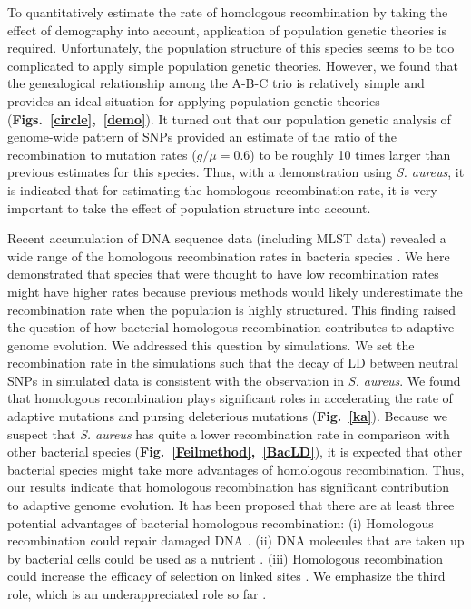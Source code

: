 \documentclass[twoside,twocolumn, letterpaper]{article}
\begin{document}
To quantitatively estimate the rate of homologous recombination by taking the effect of demography into account, application of population genetic theories is required. Unfortunately, the population structure of this species seems to be too complicated to apply simple population genetic theories.  However, we found that the genealogical relationship among the A-B-C trio is relatively simple and provides an ideal situation for applying population genetic theories ({\bf Figs.~\ref{circle},~\ref{demo}}). It turned out that our population genetic analysis of genome-wide pattern of SNPs provided an estimate of the ratio of the recombination to mutation rates ($g/\mu=0.6$) to be roughly 10 times larger than previous estimates for this species. Thus, with a demonstration using \emph{S. aureus}, it is indicated that for estimating the homologous recombination rate, it is very important to take the effect of population structure into account. 

Recent accumulation of DNA sequence data (including MLST data) revealed a wide range of the homologous recombination rates in bacteria species \cite[]{Narra_2006_16950097,Vos_2009_18830278}. We here demonstrated that species that were thought to have low recombination rates might have higher rates because previous methods \cite[]{Feil_1999_10555280,Feil_2000_10747043,Didelot_2007_17151252} would likely underestimate the recombination rate when the population is highly structured. This finding raised the question of how bacterial homologous recombination contributes to adaptive genome evolution. We addressed this question by simulations. We set the recombination rate in the simulations such that the decay of LD between neutral SNPs in simulated data is consistent with the observation in \emph{S. aureus}. We found that homologous recombination plays significant roles in accelerating the rate of adaptive mutations and pursing deleterious mutations ({\bf Fig.~\ref{ka}}). Because we suspect that \emph{S. aureus} has quite a lower recombination rate in comparison with other bacterial species ({\bf Fig.~\ref{Feilmethod},~\ref{BacLD}}), it is expected that other bacterial species might take more advantages of homologous recombination. Thus, our results indicate that homologous recombination has significant contribution to adaptive genome evolution. 
It has been proposed that there are at least three potential advantages of bacterial homologous recombination: (i) Homologous recombination could repair damaged DNA \cite[]{Michod_1988_8608929,Dubnau_1999_10547691}. (ii) DNA molecules that are taken up by bacterial cells could be used as a nutrient \cite[]{Redfield_2001_11483988}. (iii) Homologous recombination could increase the efficacy of selection on linked sites \cite[]{Vos_2009_19464181}. We emphasize the third role, which is an underappreciated role so far \cite[]{Levin_2000_10860960,Redfield_2001_11483988}. 
\end{document}
